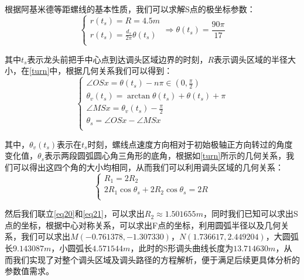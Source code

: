 \documentclass[withoutpreface,bwprint]{cumcmthesis} %
\begin{document}
根据阿基米德等距螺线的基本性质，我们可以求解S点的极坐标参数：
\begin{equation}
    \begin{cases}
    r(t_s) = R = 4.5m\\
    r(t_s) = \frac{d_s}{2\pi}\theta(t_s)\\
    \end{cases}
    \Rightarrow
    \theta(t_s) = \frac{90\pi}{17}
    \label{eq19}
\end{equation}

其中$t_s$表示龙头前把手中心点到达调头区域边界的时刻，$R$表示调头区域的半径大小，在\cref{turn}中，根据几何关系我们可以得到：
\begin{equation}
    \begin{cases}
    \angle OSx = \theta(t_s) - n\pi \in (0,\frac{\pi}{2})\\
    \theta_v(t_s) = \arctan{\theta(t_s)} + \theta(t_s) + \pi\\
    \angle MSx = \theta_v(t_s) - \frac{\pi}{2}\\
    \theta_s = \angle OSx - \angle MSx\\
    \end{cases}
    \label{eq20}
\end{equation}

其中，$\theta_v(t_s)$表示在$t_s$时刻，螺线点速度方向相对于初始极轴正方向转过的角度变化值，$\theta_s$表示两段圆弧圆心角三角形的底角，根据如\cref{turn}所示的几何关系，我们可以得出这四个角的大小均相同，从而我们可以利用调头区域的几何关系：
\begin{equation}
    \begin{cases}
    R_1 = 2R_2\\
    2R_1\cos{\theta_s} + 2R_2\cos{\theta_s} = 2R\\
    \end{cases}
    \label{eq21}
\end{equation}

然后我们联立\cref{eq20}和\cref{eq21}，可以求出$R_2\approx 1.501655m$，同时我们已知可以求出S点的坐标，根据中心对称关系，可以求出F点的坐标，利用圆弧半径以及几何关系，我们可以求出$M(-0.761378,-1.307330)$，$N(1.736617,2.449204)$，大圆弧长$9.143087m$，小圆弧长$4.571544m$，此时的S形调头曲线长度为$13.714630m$，从而我们实现了对整个调头区域及调头路径的方程解析，便于满足后续更具体分析的参数值需求。
\end{document}
